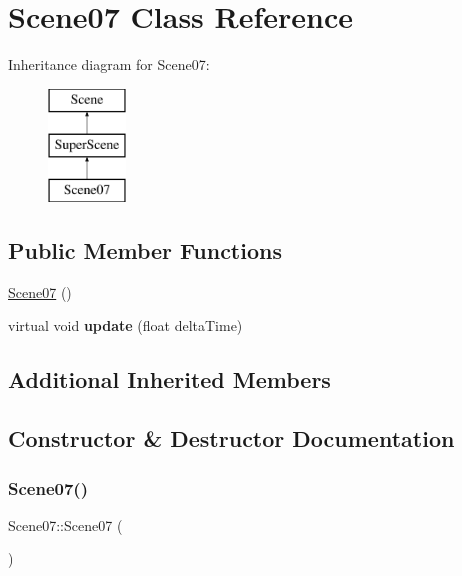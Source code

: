 \hypertarget{class_scene07}{}\section{Scene07 Class Reference}
\label{class_scene07}
Inheritance diagram for Scene07\+:\begin{figure}[H]
\begin{center}
\leavevmode
\includegraphics[height=3.000000cm]{class_scene07}
\end{center}
\end{figure}
\subsection*{Public Member Functions}
\begin{DoxyCompactItemize}
\item 
\hyperlink{class_scene07_a22c12ec7c0df5e38b289a459da70989b}{Scene07} ()
\item 
\mbox{\label{class_scene07_a6fc20b8453f220586b73aed9af50afce}} 
virtual void {\bfseries update} (float delta\+Time)
\end{DoxyCompactItemize}
\subsection*{Additional Inherited Members}


\subsection{Constructor \& Destructor Documentation}
\mbox{\label{class_scene07_a22c12ec7c0df5e38b289a459da70989b}} 
\subsubsection{\texorpdfstring{Scene07()}{Scene07()}}
{\footnotesize\ttfamily Scene07\+::\+Scene07 (\begin{DoxyParamCaption}{ }\end{DoxyParamCaption})}

